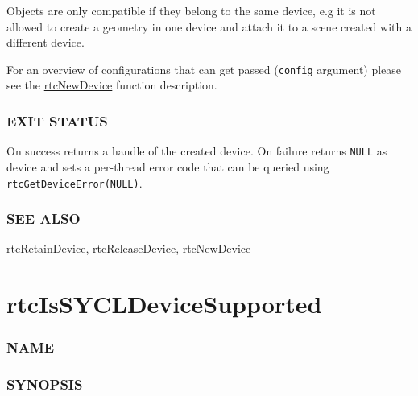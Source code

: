 Objects are only compatible if they belong to the same device, e.g it is
not allowed to create a geometry in one device and attach it to a scene
created with a different device.

For an overview of configurations that can get passed (\texttt{config}
argument) please see the \hyperref[rtcnewdevice]{rtcNewDevice} function
description.

\subsubsection{EXIT STATUS}\label{exit-status}

On success returns a handle of the created device. On failure returns
\texttt{NULL} as device and sets a per-thread error code that can be
queried using \texttt{rtcGetDeviceError(NULL)}.

\subsubsection{SEE ALSO}\label{see-also}

\hyperref[rtcretaindevice]{rtcRetainDevice},
\hyperref[rtcreleasedevice]{rtcReleaseDevice},
\hyperref[rtcnewdevice]{rtcNewDevice}

\pagebreak

\section{rtcIsSYCLDeviceSupported}\label{rtcissycldevicesupported}

\subsubsection{NAME}\label{name}

\begin{Shaded}
\begin{Highlighting}[]
\OperatorTok{{-}}
\end{Highlighting}
\end{Shaded}

\subsubsection{SYNOPSIS}\label{synopsis}

\begin{Shaded}
\begin{Highlighting}[]

\OperatorTok{(}\OperatorTok{::}\OperatorTok{);}
\end{Highlighting}
\end{Shaded}

